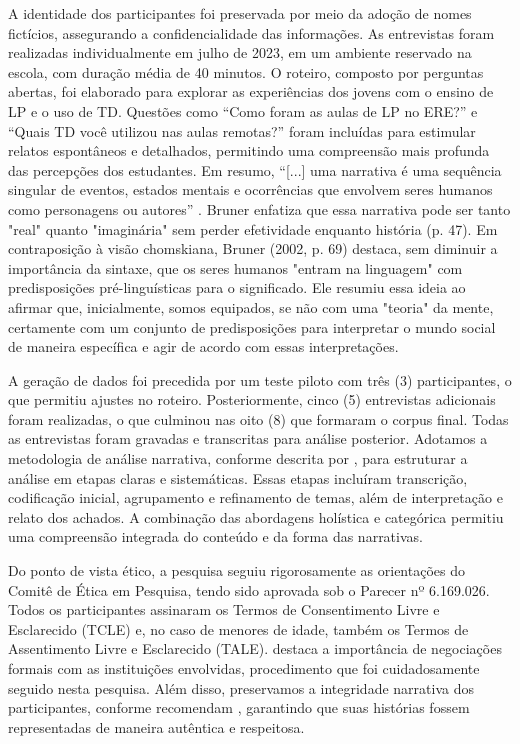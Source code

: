 \documentclass[portuguese]{textolivre}
\begin{document}
A identidade dos participantes foi preservada por meio da adoção de nomes fictícios, assegurando a confidencialidade das informações. As entrevistas foram realizadas individualmente em julho de 2023, em um ambiente reservado na escola, com duração média de 40 minutos. O roteiro, composto por perguntas abertas, foi elaborado para explorar as experiências dos jovens com o ensino de LP e o uso de TD. Questões como “Como foram as aulas de LP no ERE?” e “Quais TD você utilizou nas aulas remotas?” foram incluídas para estimular relatos espontâneos e detalhados, permitindo uma compreensão mais profunda das percepções dos estudantes. Em resumo, “[...] uma narrativa é uma sequência singular de eventos, estados mentais e ocorrências que envolvem seres humanos como personagens ou autores” \cite[p. 46]{bruner2002atos}. Bruner enfatiza que essa narrativa pode ser tanto "real" quanto "imaginária" sem perder efetividade enquanto história (p. 47). Em contraposição à visão chomskiana, Bruner (2002, p. 69) destaca, sem diminuir a importância da sintaxe, que os seres humanos "entram na linguagem" com predisposições pré-linguísticas para o significado. Ele resumiu essa ideia ao afirmar que, inicialmente, somos equipados, se não com uma "teoria" da mente, certamente com um conjunto de predisposições para interpretar o mundo social de maneira específica e agir de acordo com essas interpretações.

A geração de dados foi precedida por um teste piloto com três (3) participantes, o que permitiu ajustes no roteiro. Posteriormente, cinco (5) entrevistas adicionais foram realizadas, o que culminou nas oito (8) que formaram o corpus final. Todas as entrevistas foram gravadas e transcritas para análise posterior. Adotamos a metodologia de análise narrativa, conforme descrita por \textcite{lieblich1998}, para estruturar a análise em etapas claras e sistemáticas. Essas etapas incluíram transcrição, codificação inicial, agrupamento e refinamento de temas, além de interpretação e relato dos achados. A combinação das abordagens holística e categórica permitiu uma compreensão integrada do conteúdo e da forma das narrativas.

Do ponto de vista ético, a pesquisa seguiu rigorosamente as orientações do Comitê de Ética em Pesquisa, tendo sido aprovada sob o Parecer nº 6.169.026. Todos os participantes assinaram os Termos de Consentimento Livre e Esclarecido (TCLE) e, no caso de menores de idade, também os Termos de Assentimento Livre e Esclarecido (TALE). \textcite{oliveira2016} destaca a importância de negociações formais com as instituições envolvidas, procedimento que foi cuidadosamente seguido nesta pesquisa. Além disso, preservamos a integridade narrativa dos participantes, conforme recomendam \textcite{todorov1983,barcelos2020}, garantindo que suas histórias fossem representadas de maneira autêntica e respeitosa.
\end{document}
